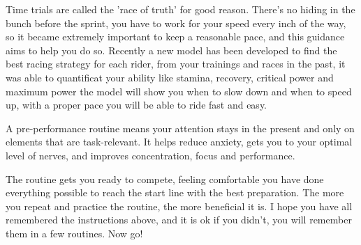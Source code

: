 \documentclass[12pt]{article}
\begin{document}
Time trials are called the 'race of truth' for good reason. There's no hiding in the bunch before the sprint, you have to work for your speed every inch of the way, so it
became extremely  important to keep a reasonable pace, and this guidance aims to help you do so.
Recently a new model has been developed to find the best racing strategy for each rider, from your trainings and races in the past, it was able to quantificat your ability
like stamina, recovery, critical power and maximum power the model will show you when to slow down and when to speed up, with a proper pace you will be able to ride
fast and easy.

A pre-performance routine means your attention stays in the present and only on elements that are task-relevant. It helps reduce anxiety, gets you to your optimal level
of nerves, and improves concentration, focus and performance.

The routine gets you ready to compete, feeling comfortable you have done everything possible to reach the start line with the best preparation. The more you repeat and
practice the routine, the more beneficial it is. I hope you have all remembered the instructions above, and it is ok if you didn't, you will remember them in a few routines.
Now go!




\end{document}
